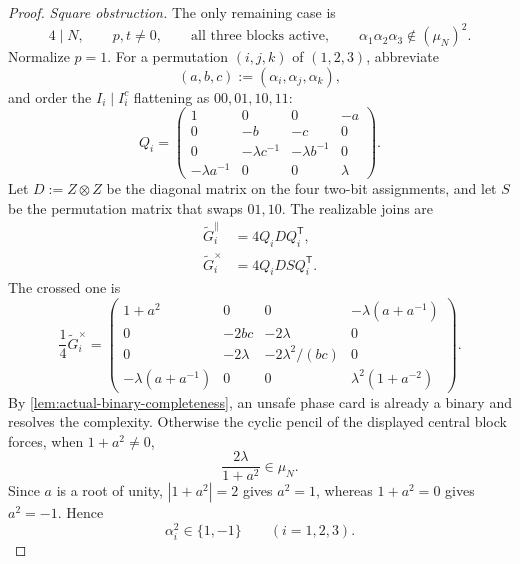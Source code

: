 \documentclass[11pt,letterpaper,onecolumn]{article}
\theoremstyle{plain}
\theoremstyle{definition}
\theoremstyle{remark}
\begin{document}
\begin{proof}
\emph{Square obstruction.}
The only remaining case is
\begin{equation*}
 4\mid N,\qquad
 p,t\ne0,\qquad
 \text{all three blocks active},\qquad
 \alpha_1\alpha_2\alpha_3\notin(\mu_N)^2.
\end{equation*}
  Normalize \(p=1\).  For a permutation \((i,j,k)\) of \((1,2,3)\),
  abbreviate
  \[
   (a,b,c):=(\alpha_i,\alpha_j,\alpha_k),
  \]
  and order
the \(I_i\mid I_i^c\) flattening as \(00,01,10,11\):
\begin{equation*}
 Q_i=
 \begin{pmatrix}
  1&0&0&-a\\
  0&-b&-c&0\\
  0&-\lambda c^{-1}&-\lambda b^{-1}&0\\
  -\lambda a^{-1}&0&0&\lambda
 \end{pmatrix}.
\end{equation*}
Let \(D:=Z\otimes Z\) be the diagonal matrix on the four two-bit assignments, and let \(S\) be
the permutation matrix that swaps \(01,10\).  The realizable joins are
\begin{align*}
 \widetilde G_i^{\parallel}&=4Q_iDQ_i^{\mathsf T},
 \\
 \widetilde G_i^{\times}&=4Q_iDSQ_i^{\mathsf T}.
\end{align*}
The crossed one is
\begin{equation*}
 \frac14\widetilde G_i^{\times}
 =
 \begin{pmatrix}
  1+a^2&0&0&-\lambda(a+a^{-1})\\
  0&-2bc&-2\lambda&0\\
  0&-2\lambda&-2\lambda^2/(bc)&0\\
  -\lambda(a+a^{-1})&0&0&\lambda^2(1+a^{-2})
 \end{pmatrix}.
\end{equation*}
By \cref{lem:actual-binary-completeness}, an unsafe phase card is already a
binary and resolves the complexity. Otherwise the cyclic pencil
of the displayed central block forces, when \(1+a^2\ne0\),
\[
 \frac{2\lambda}{1+a^2}\in\mu_N.
\]
Since \(a\) is a root of unity, \(|1+a^2|=2\) gives \(a^2=1\), whereas
\(1+a^2=0\) gives \(a^2=-1\).  Hence
\begin{equation*}
 \alpha_i^2\in\{1,-1\}\qquad(i=1,2,3).
\end{equation*}


\end{proof}
\end{document}
